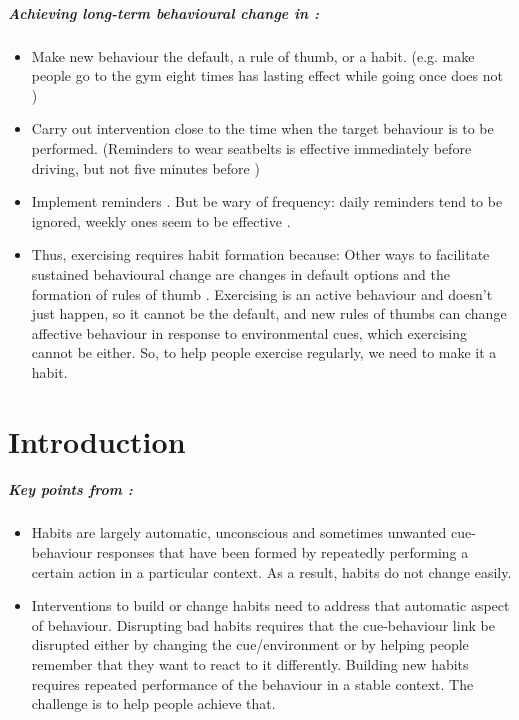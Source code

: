 \documentclass[a4paper, 11pt]{report}
\begin{document}
\paragraph{Achieving long-term behavioural change in \citet{hallsworth2016applying}:}
\begin{itemize}
	\item Make new behaviour the default, a rule of thumb, or a habit. (e.g. make people go to the gym eight times has lasting effect while going once does not \citep{charness2009incentives})

	\item Carry out intervention close to the time when the target behaviour is to be performed. (Reminders to wear seatbelts is effective immediately before driving, but not five minutes before \citep{austin2006examination})

	\item Implement reminders \citep{altmann2014nudges}. But be wary of frequency: daily reminders tend to be ignored, weekly ones seem to be effective \citep{pop2011mobile}.

	\item Thus, exercising requires habit formation because: Other ways to facilitate sustained behavioural change are changes in default options and the formation of rules of thumb \citep{hallsworth2016applying}. Exercising is an active behaviour and doesn't just happen, so it cannot be the default, and new rules of thumbs can change affective behaviour in response to environmental cues, which exercising cannot be either. So, to help people exercise regularly, we need to make it a habit.
\end{itemize}



\chapter{Introduction}

\paragraph{Key points from \citet{runger2015maintenance}:}
\begin{itemize}
	\item Habits are largely automatic, unconscious and sometimes unwanted cue-behaviour responses that have been formed by repeatedly performing a certain action in a particular context. As a result, habits do not change easily.

	\item Interventions to build or change habits need to address that automatic aspect of behaviour. Disrupting bad habits requires that the cue-behaviour link be disrupted either by changing the cue/environment or by helping people remember that they want to react to it differently. Building new habits requires repeated performance of the behaviour in a stable context. The challenge is to help people achieve that.
\end{itemize}
\end{document}

